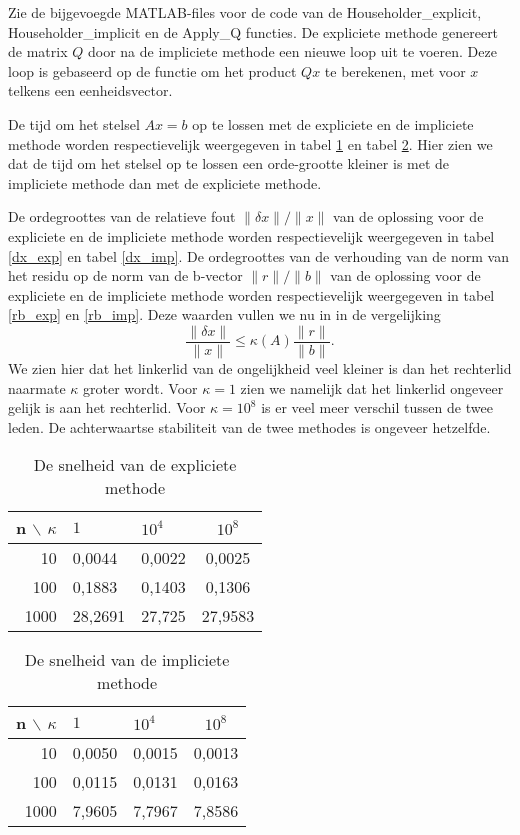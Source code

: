 Zie de bijgevoegde MATLAB-files voor de code van de Householder\_explicit, Householder\_implicit en de Apply\_Q functies. De expliciete methode genereert de matrix $Q$ door na de impliciete methode een nieuwe loop uit te voeren. Deze loop is gebaseerd op de functie om het product $Qx$ te berekenen, met voor $x$ telkens een eenheidsvector.

De tijd om het stelsel $Ax=b$ op te lossen met de expliciete en de impliciete methode worden respectievelijk weergegeven in tabel \ref{snelheid_exp} en tabel \ref{snelheid_imp}. Hier zien we dat de tijd om het stelsel op te lossen een orde-grootte kleiner is met de impliciete methode dan met de expliciete methode.

De ordegroottes van de relatieve fout $\lVert \delta x \rVert/\lVert x \rVert$ van de oplossing voor de expliciete en de impliciete methode worden respectievelijk weergegeven in tabel \ref{dx_exp} en tabel \ref{dx_imp}.
De ordegroottes van de verhouding van de norm van het residu op de norm van de b-vector $\lVert r \rVert/\lVert b \rVert$ van de oplossing voor de expliciete en de impliciete methode worden respectievelijk weergegeven in tabel \ref{rb_exp} en \ref{rb_imp}. Deze waarden vullen we nu in in de vergelijking
$$ \frac{\lVert \delta x \rVert}{\lVert x \rVert} \leq \kappa(A) \frac{\lVert r \rVert}{\lVert b \rVert}.$$
We zien hier dat het linkerlid van de ongelijkheid veel kleiner is dan het rechterlid naarmate $\kappa$ groter wordt. Voor $\kappa = 1$ zien we namelijk dat het linkerlid ongeveer gelijk is aan het rechterlid. Voor $\kappa = 10^8$ is er veel meer verschil tussen de twee leden. De achterwaartse stabiliteit van de twee methodes is ongeveer hetzelfde. 

\begin{table}
\begin{center}
\begin{tabular}{r|llc}
n $\backslash$ $\kappa$ & $1$ & $10^4$ & $10^8$ \\\hline
10 & 0,0044 & 0,0022 & 0,0025 \\
100 & 0,1883 & 0,1403 & 0,1306 \\
1000 & 28,2691 & 27,725 & 27,9583
\end{tabular}
\end{center}
\caption{De snelheid van de expliciete methode}
\label{snelheid_exp}
\end{table}

\begin{table}
\begin{center}
\begin{tabular}{r|llc}
n $\backslash$ $\kappa$ & $1$ & $10^4$ & $10^8$ \\\hline
10 & 0,0050 & 0,0015 & 0,0013 \\
100 & 0,0115 & 0,0131 & 0,0163 \\
1000 & 7,9605 & 7,7967 & 7,8586
\end{tabular}
\end{center}
\caption{De snelheid van de impliciete methode}
\label{snelheid_imp}
\end{table}

